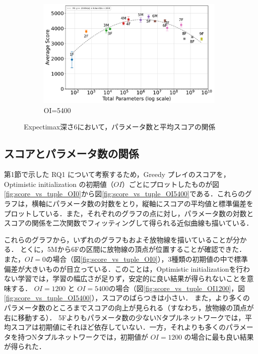 \begin{figure}[t]
    \vspace{1em}
    \begin{subfigure}[b]{\linewidth}
        \centering
        \includegraphics[width=\linewidth]{pdf/parameter_performance_plots/params_performance_OI5400_EXP6.pdf}
        \caption{OI=5400}
        \label{fig:score_vs_tuple_OI5400_EXP6}
    \end{subfigure}

    \caption{Expectimax深さ6において，パラメータ数と平均スコアの関係}
    \label{fig:score_vs_tuple_all_EXP6}
\end{figure}

\subsection{スコアとパラメータ数の関係}
第1節で示した RQ1 について考察するため，Greedy プレイのスコアを，Optimistic initialization の初期値（$\mathit{OI}$）ごとにプロットしたものが図\ref{fig:score_vs_tuple_OI0}から図\ref{fig:score_vs_tuple_OI5400}である．これらのグラフは，横軸にパラメータ数の対数をとり，縦軸にスコアの平均値と標準偏差をプロットしている．また，それぞれのグラフの点に対し，パラメータ数の対数とスコアの関係を二次関数でフィッティングして得られる近似曲線も描いている．

これらのグラフから，いずれのグラフもおよそ放物線を描いていることが分かる．
とくに，\textsf{5M}から\textsf{6F}の区間に放物線の頂点が位置することが確認できた．
また，$\mathit{OI}=0$の場合（図\ref{fig:score_vs_tuple_OI0}），3種類の初期値の中で標準偏差が大きいものが目立っている．このことは，Optimistic initializationを行わない学習では，学習の幅広さが足りず，安定的に良い結果が得られないことを意味する．
$\mathit{OI}=1200$ と $\mathit{OI}=5400$の場合（図\ref{fig:score_vs_tuple_OI1200}，図\ref{fig:score_vs_tuple_OI5400}），スコアのばらつきは小さい．
また，より多くのパラメータ数のところまでスコアの向上が見られる（すなわち，放物線の頂点が右に移動する）．
\textsf{5F}よりもパラメータ数の少ないNタプルネットワークでは，平均スコアは初期値にそれほど依存していない．一方，それよりも多くのパラメータを持つNタプルネットワークでは，初期値が $\mathit{OI}=1200$ の場合に最も良い結果が得られた．

